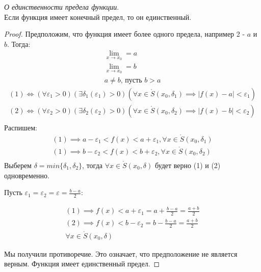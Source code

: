 \begin{theorem}
  \textit{О единственности предела функции}. \\
  Если функция имеет конечный предел, то он единственный.
\end{theorem}
\begin{proof}
 Предположим, что функция имеет более одного предела, например 2 - $a$ и $b$. Тогда:
 \begin{gather*}
   \lim_{x \to x_0} = a \tag{1} \\  
   \lim_{x \to x_0} = b  \tag{2} \\
    a \neq b \text{, пусть } b > a
 \end{gather*}
 \begin{gather*}
   (1) \iff (\forall  \varepsilon_1 > 0)(\exists  \delta_1(\varepsilon_1) > 0)(\forall  x \in  \mathring{S}(x_0, \delta_1) \implies |f(x) - a| < \varepsilon_1) \\
   (2) \iff (\forall  \varepsilon_2 > 0)(\exists  \delta_2(\varepsilon_2) > 0)(\forall  x \in  \mathring{S}(x_0, \delta_2) \implies |f(x) - b| < \varepsilon_2) \\
 \end{gather*}
 Распишем:
 \begin{gather*}
   (1) \implies a - \varepsilon_1 < f(x) < a + \varepsilon_1, \forall  x \in \mathring{S}(x_0, \delta_1) \\
   (1) \implies b - \varepsilon_2 < f(x) < b + \varepsilon_2, \forall  x \in \mathring{S}(x_0, \delta_2) \\
 \end{gather*}
 Выберем $\delta = min \{\delta_1, \delta_2\}$, тогда $\forall x \in  \mathring{S}(x_0, \delta)$
 будет верно (1) и (2) одновременно.

 Пусть $\varepsilon_1 = \varepsilon_2 = \varepsilon = \frac{b - a}{2}$:

 \begin{gather*}
  (1) \implies f(x) < a + \varepsilon_1 = a + \frac{b - a}{2} = \frac{a + b}{2} \\
  (2) \implies f(x) < b - \varepsilon_2 = b - \frac{b - a}{2} = \frac{a + b}{2} \\
  \forall x \in \mathring{S}(x_0, \delta)
 \end{gather*}
 
 Мы получили противоречие. Это означает, что предположение не является верным. Функция имеет единственный предел.
\end{proof}

